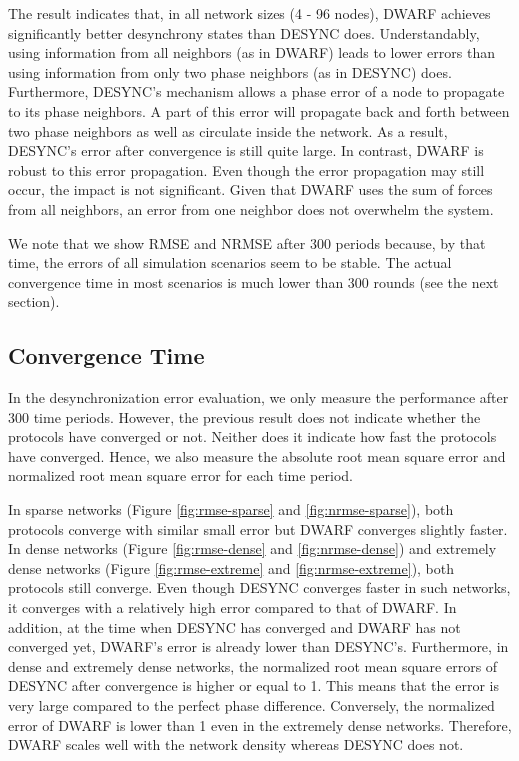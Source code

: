 The result indicates that, in all network sizes (4 - 96 nodes), DWARF achieves significantly better  desynchrony states than DESYNC does.
Understandably, using information from all neighbors (as in DWARF) leads to lower errors than using information from only two phase neighbors (as in DESYNC) does. Furthermore, DESYNC's mechanism allows a phase error of a node to propagate to its phase neighbors. A part of this error will propagate back and forth between two phase neighbors as well as circulate inside the network. As a result, DESYNC's error after convergence is still quite large.
In contrast, DWARF is robust to this error propagation. Even though the error propagation may still occur, the impact is not significant. Given that DWARF uses the sum of forces from all neighbors, an error from one neighbor does not overwhelm the system.

We note that we show RMSE and NRMSE after 300 periods because, by that time, the errors of all simulation scenarios seem to be stable. The actual convergence time in most scenarios is much lower than 300 rounds (see the next section).

\subsection{Convergence Time}
\label{sec:converge}
In the desynchronization error evaluation, we only measure the performance after 300 time periods.
However, the previous result does not indicate whether the protocols have converged or not.
Neither does it indicate how fast the protocols have converged. 
Hence, we also measure the absolute root mean square error and normalized root mean square error for each time period.

In sparse networks (Figure \ref{fig:rmse-sparse} and \ref{fig:nrmse-sparse}), both protocols converge with similar small error but DWARF converges slightly faster. 
In dense networks (Figure \ref{fig:rmse-dense} and \ref{fig:nrmse-dense}) and extremely dense networks (Figure \ref{fig:rmse-extreme} and \ref{fig:nrmse-extreme}), both protocols still converge.
Even though DESYNC converges faster in such networks, it converges with a relatively high error compared to that of DWARF.
In addition, at the time when DESYNC has converged and DWARF has not converged yet, DWARF's error is already lower than DESYNC's.
Furthermore, in dense and extremely dense networks, the normalized root mean square errors of DESYNC after convergence is higher or equal to 1.
This means that the error is very large compared to the perfect phase difference.
Conversely, the normalized error of DWARF is lower than 1 even in the extremely dense networks.
Therefore, DWARF scales well with the network density whereas DESYNC does not.

